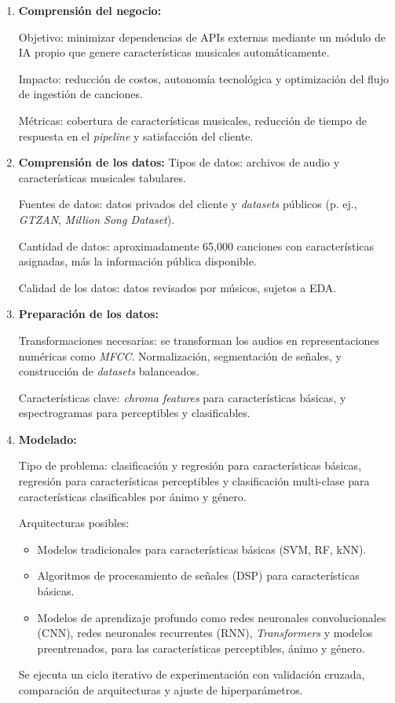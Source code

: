 \documentclass[
11pt, %
]{charter}
\begin{document}
\begin{enumerate}
  \item \textbf{Comprensión del negocio:} 
  
  Objetivo: minimizar dependencias de APIs externas mediante un módulo de IA propio que genere características musicales automáticamente.  
  
  Impacto: reducción de costos, autonomía tecnológica y optimización del flujo de ingestión de canciones.  
  
  Métricas: cobertura de características musicales, reducción de tiempo de respuesta en el \textit{pipeline} y satisfacción del cliente.
  
  \item \textbf{Comprensión de los datos:}
  Tipos de datos: archivos de audio y características musicales tabulares.

  Fuentes de datos: datos privados del cliente y \textit{datasets} públicos (p. ej., \textit{GTZAN}, \textit{Million Song Dataset}).

  Cantidad de datos: aproximadamente 65,000 canciones con características asignadas, más la información pública disponible.

  Calidad de los datos: datos revisados por músicos, sujetos a EDA.

  \item \textbf{Preparación de los datos:}

  Transformaciones necesarias: se transforman los audios en representaciones numéricas como \textit{MFCC}. Normalización, segmentación de señales, y construcción de \textit{datasets} balanceados.

  Características clave: \textit{chroma features} para características básicas, y espectrogramas para perceptibles y clasificables.

  \item \textbf{Modelado:} 

  Tipo de problema: clasificación y regresión para características básicas, regresión para características perceptibles y clasificación multi-clase para características clasificables por ánimo y género.

  Arquitecturas posibles:
  \begin{itemize}
    \item Modelos tradicionales para características básicas (SVM, RF, kNN).
    \item Algoritmos de procesamiento de señales (DSP) para características básicas.
    \item Modelos de aprendizaje profundo como redes neuronales convolucionales (CNN),  redes neuronales recurrentes (RNN), \textit{Transformers} y modelos preentrenados, para las características perceptibles, ánimo y género.
  \end{itemize}
  Se ejecuta un ciclo iterativo de experimentación con validación cruzada, comparación de arquitecturas y ajuste de hiperparámetros.


\end{enumerate}
\end{document}
